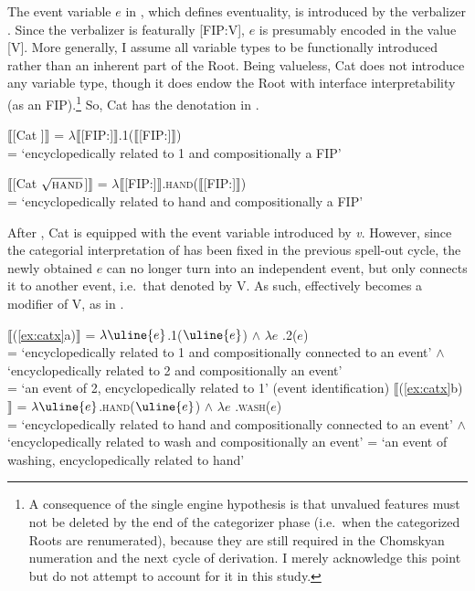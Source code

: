 \documentclass[output=paper]{langsci/langscibook}
\begin{document}
\largerpage[-1]
The event variable $e$ in , which defines eventuality, is
introduced by the verbalizer \citep[cf.][]{Marantz2013}. Since the verbalizer
is featurally [FIP:V], $e$ is presumably encoded in the value [V]. More
generally, I assume all variable types to be functionally introduced rather
than an inherent part of the Root. Being valueless, Cat does not introduce any
variable type, though it does endow the Root with interface interpretability
(as an FIP).\footnote{A consequence of the single engine hypothesis is that
    unvalued features must not be deleted by the end of the categorizer phase
    (i.e.\ when the categorized Roots are renumerated), because they are still
    required in the Chomskyan numeration and the next cycle of derivation. I
    merely acknowledge this point but do not attempt to account for it in this
study.} So, Cat\textsubscript{\textsurd} has the denotation in .

\ea\label{ex:sem2}
\ea\label{ex:sem2a}
{\upshape
$⟦$[Cat {}]$⟧$ =
$\lambda$$⟦$[FIP:\uline{\hspace{3mm}}]$⟧$.1($⟦$[FIP:\uline{\hspace{3mm}}]$⟧$)\\
= `encyclopedically related to 1 and compositionally a \uline{\hspace{3mm}}
FIP'
}
\ex\label{ex:sem2b}
{\upshape
$⟦$[Cat $\sqrt{\textrm{\textsc{hand}}}$]$⟧$ =
$\lambda$$⟦$[FIP:\uline{\hspace{3mm}}]$⟧$.\textsc{hand}($⟦$[FIP:\uline{\hspace{3mm}}]$⟧$)\\
= `encyclopedically related to hand and compositionally a
\uline{\hspace{3mm}} \gls{FIP}'

}
\z
\z

\noindent After , Cat\textsubscript{\textsurd} is equipped with the event variable introduced by {\em v}. However, since the categorial interpretation of {} has been fixed in the previous spell-out cycle, the newly obtained $e$ can no longer turn {} into an independent event, but only connects it to another event, i.e.\ that denoted by V\textsubscript{\textsurd}. As such, {} effectively becomes a modifier of V\textsubscript{\textsurd}, as in .

\ea\label{ex:sem3}
\ea\label{ex:sem3a}
{\upshape
$⟦$(\ref{ex:catx}a)$⟧$ = $\lambda \uline{e}$.1($\uline{e}$) $\wedge$ $\lambda e$ .2($e$)\\ = `encyclopedically related to 1 and compositionally connected to an event' $\wedge$ `encyclopedically related to 2 and compositionally an event' \\ = `an event of 2, encyclopedically related to 1' \hfill (event identification)
}
\ex\label{ex:sem3b}
{\upshape
$⟦$(\ref{ex:catx}b)$⟧$ = $\lambda \uline{e}$.\textsc{hand}($\uline{e}$) $\wedge$ $\lambda e$ .\textsc{wash}($e$)\\ = `encyclopedically related to hand and compositionally connected to an event' $\wedge$ `encyclopedically related to wash and compositionally an event' = `an event of washing, encyclopedically related to hand'
}
\z
\z
\end{document}
